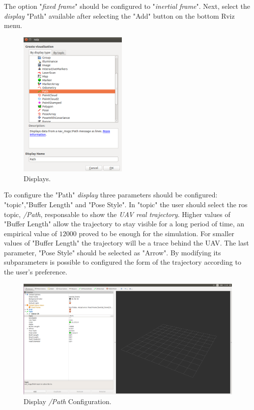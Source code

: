 		The option "\textit{fixed frame}"  should be configured to "\textit{inertial frame}". Next, select the \textit{display} "Path" available after selecting the "Add" button on the bottom Rviz menu.


		
		
		\begin{figure}[!ht]
			\centering
			\includegraphics[width=150pt]{figuras/rvizconfig.png}
			\caption{Displays.}
			\label{rvizconfig}
		\end{figure}
		
		To configure the "Path" \textit{display} three parameters should be configured: "topic","Buffer Length" and "Pose Style". 
		In "topic" the user should select the ros topic, \textit{/Path}, responsable to show the \textit{UAV real trajectory}. Higher values of "Buffer Length" allow the trajectory to stay visible for a long period of time, an empirical value of $12000$ proved to be enough for the simulation. For smaller values of "Buffer Length" the trajectory will be a trace behind the UAV. The last parameter, "Pose Style" should be selected as "Arrow". By modifying its subparameters is possible to configured the form of the trajectory according to the user's preference.
	
		
		
		\begin{figure}[!ht]
			\centering
			\includegraphics[width=450pt]{figuras/rvizconfig2.png}
			\caption{ Display \textit{/Path} Configuration.}
			\label{rvizconfig2}
		\end{figure}
		
